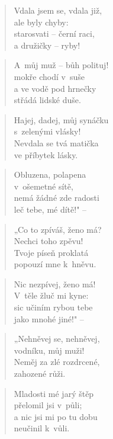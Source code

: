 \begin{verse}
Vdala jsem se, vdala již, \\
ale byly chyby: \\
starosvati -- černí raci, \\
a družičky -- ryby!
\end{verse}

\begin{verse}
A~můj muž -- bůh polituj! \\
mokře chodí v~suše \\
a ve vodě pod hrnečky \\
střádá lidské duše.
\end{verse}

\begin{verse}
Hajej, dadej, můj synáčku \\
s~zelenými vlásky! \\
Nevdala se tvá matička \\
ve příbytek lásky.
\end{verse}

\begin{verse}
Obluzena, polapena \\
v~ošemetné sítě, \\
nemá žádné zde radosti \\
leč tebe, mé dítě!" --
\end{verse}

\begin{verse}
„Co to zpíváš, ženo má? \\
Nechci toho zpěvu! \\
Tvoje píseň proklatá \\
popouzí mne k~hněvu.
\end{verse}

\begin{verse}
Nic nezpívej, ženo má! \\
V~těle žluč mi kyne: \\
sic učiním rybou tebe \\
jako mnohé jiné!" --
\end{verse}

\begin{verse}
„Nehněvej se, nehněvej, \\
vodníku, můj muži! \\
Neměj za zlé rozdrcené, \\
zahozené růži.
\end{verse}

\begin{verse}
Mladosti mé jarý štěp \\
přelomil jsi v~půli; \\
a nic jsi mi po tu dobu \\
neučinil k~vůli.
\end{verse}

